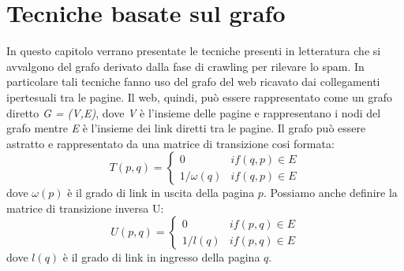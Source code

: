 \chapter{Tecniche basate sul grafo}
In questo capitolo verrano presentate le tecniche presenti in letteratura che si avvalgono del grafo derivato dalla fase di crawling per rilevare lo spam. In particolare tali tecniche fanno uso del grafo del web ricavato dai collegamenti ipertesuali tra le pagine. Il web, quindi, può essere rappresentato come un grafo diretto \textit{G = (V,E)}, dove \textit{V} è l'insieme delle pagine e rappresentano i nodi del grafo mentre \textit{E} è l'insieme dei link diretti tra le pagine. Il grafo può essere astratto e rappresentato da una matrice di transizione cosi formata:
\begin{equation}
T(p,q)=\left \{
\begin{array}{cc}
0 & if(q,p) \in E\\
1/\omega(q) & if(q,p) \in E
\end{array}
\right .
\end{equation}
dove \(\omega(p)\) è il grado di link in uscita della pagina \(p\).
Possiamo anche definire la matrice di transizione inversa U:
\begin{equation}
U(p,q)=\left \{
\begin{array}{cc}
0 & if(p,q) \in E\\
1/l(q) & if(p,q) \in E
\end{array}
\right .
\end{equation}
dove \(l(q)\) è il grado di link in ingresso della pagina \(q\).
